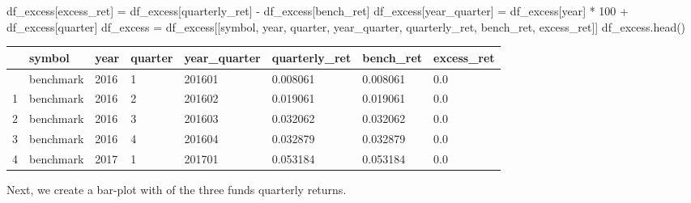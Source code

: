 \documentclass[
  letterpaper,
  DIV=11,
  numbers=noendperiod]{scrreprt}
\newenvironment{Shaded}{\begin{snugshade}}{\end{snugshade}}
\newcommand{\DecValTok}[1]{\textcolor[rgb]{0.68,0.00,0.00}{#1}}
\newcommand{\NormalTok}[1]{\textcolor[rgb]{0.00,0.23,0.31}{#1}}
\newcommand{\OperatorTok}[1]{\textcolor[rgb]{0.37,0.37,0.37}{#1}}
\newcommand{\StringTok}[1]{\textcolor[rgb]{0.13,0.47,0.30}{#1}}
\begin{document}
\begin{Shaded}
\begin{Highlighting}[]
\NormalTok{df\_excess[}\StringTok{\textquotesingle{}excess\_ret\textquotesingle{}}\NormalTok{] }\OperatorTok{=}\NormalTok{ df\_excess[}\StringTok{\textquotesingle{}quarterly\_ret\textquotesingle{}}\NormalTok{] }\OperatorTok{{-}}\NormalTok{ df\_excess[}\StringTok{\textquotesingle{}bench\_ret\textquotesingle{}}\NormalTok{]}
\NormalTok{df\_excess[}\StringTok{\textquotesingle{}year\_quarter\textquotesingle{}}\NormalTok{] }\OperatorTok{=}\NormalTok{ df\_excess[}\StringTok{\textquotesingle{}year\textquotesingle{}}\NormalTok{] }\OperatorTok{*} \DecValTok{100} \OperatorTok{+}\NormalTok{ df\_excess[}\StringTok{\textquotesingle{}quarter\textquotesingle{}}\NormalTok{]}
\NormalTok{df\_excess }\OperatorTok{=}\NormalTok{ df\_excess[[}\StringTok{\textquotesingle{}symbol\textquotesingle{}}\NormalTok{, }\StringTok{\textquotesingle{}year\textquotesingle{}}\NormalTok{, }\StringTok{\textquotesingle{}quarter\textquotesingle{}}\NormalTok{, }\StringTok{\textquotesingle{}year\_quarter\textquotesingle{}}\NormalTok{, }\StringTok{\textquotesingle{}quarterly\_ret\textquotesingle{}}\NormalTok{, }\StringTok{\textquotesingle{}bench\_ret\textquotesingle{}}\NormalTok{, }\StringTok{\textquotesingle{}excess\_ret\textquotesingle{}}\NormalTok{]]}
\NormalTok{df\_excess.head()}
\end{Highlighting}
\end{Shaded}

\begin{longtable}[]{@{}llllllll@{}}
\toprule\noalign{}
& symbol & year & quarter & year\_quarter & quarterly\_ret & bench\_ret
& excess\_ret \\
\midrule\noalign{}
\endhead
\bottomrule\noalign{}
\endlastfoot
0 & benchmark & 2016 & 1 & 201601 & 0.008061 & 0.008061 & 0.0 \\
1 & benchmark & 2016 & 2 & 201602 & 0.019061 & 0.019061 & 0.0 \\
2 & benchmark & 2016 & 3 & 201603 & 0.032062 & 0.032062 & 0.0 \\
3 & benchmark & 2016 & 4 & 201604 & 0.032879 & 0.032879 & 0.0 \\
4 & benchmark & 2017 & 1 & 201701 & 0.053184 & 0.053184 & 0.0 \\
\end{longtable}

Next, we create a bar-plot with of the three funds quarterly returns.
\end{document}
